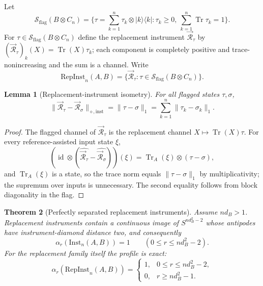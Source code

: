 \documentclass[11pt,a4paper]{article}
\newtheorem{theorem}{Theorem}[section]
\newtheorem{lemma}[theorem]{Lemma}
\newcommand{\Sstate}{\mathcal{S}}
\newcommand{\Inst}{\mathrm{Inst}}
\newcommand{\RepInst}{\mathrm{RepInst}}
\newcommand{\Tr}{\operatorname{Tr}}
\newcommand{\id}{\operatorname{id}}
\begin{document}
Let
\[
\Sstate_{\mathrm{flag}}(B\otimes C_n)
=\Big\{\tau=\sum_{k=1}^n\tau_k\otimes|k\rangle\langle k|:
\tau_k\ge0,\ \sum_{k=1}^n\Tr\tau_k=1\Big\}.
\]
For $\tau\in\Sstate_{\mathrm{flag}}(B\otimes C_n)$ define the replacement instrument $\vec{\mathcal R}_\tau$ by $(\vec{\mathcal R}_\tau)_k(X)=\Tr(X)\tau_k$; each component is completely positive and trace-nonincreasing and the sum is a channel. Write
\[
\RepInst_n(A,B)=\{\vec{\mathcal R}_\tau:\tau\in\Sstate_{\mathrm{flag}}(B\otimes C_n)\}.
\]

\begin{lemma}[Replacement-instrument isometry]
\label{lem:replacement-isometry}
For all flagged states $\tau,\sigma$,
\[
\|\vec{\mathcal R}_\tau-\vec{\mathcal R}_\sigma\|_{\diamond,\mathrm{inst}}
=\|\tau-\sigma\|_1=\sum_{k=1}^n\|\tau_k-\sigma_k\|_1.
\]
\end{lemma}

\begin{proof}
The flagged channel of $\vec{\mathcal R}_\tau$ is the replacement channel $X\mapsto\Tr(X)\tau$. For every reference-assisted input state $\xi$,
\[
(\id\otimes(\widehat{\vec{\mathcal R}_\tau}-\widehat{\vec{\mathcal R}_\sigma}))(\xi)
=\Tr_A(\xi)\otimes(\tau-\sigma),
\]
and $\Tr_A(\xi)$ is a state, so the trace norm equals $\|\tau-\sigma\|_1$ by multiplicativity; the supremum over inputs is unnecessary. The second equality follows from block diagonality in the flag.
\end{proof}

\begin{theorem}[Perfectly separated replacement instruments]
\label{thm:replacement-profile}
Assume $nd_B>1$. Replacement instruments contain a continuous image of $S^{nd_B^2-2}$ whose antipodes have instrument-diamond distance two, and consequently
\[
\alpha_r(\Inst_n(A,B))=1\qquad(0\le r\le nd_B^2-2).
\]
For the replacement family itself the profile is exact:
\[
\alpha_r(\RepInst_n(A,B))=
\begin{cases}
1,&0\le r\le nd_B^2-2,\\
0,&r\ge nd_B^2-1.
\end{cases}
\]
\end{theorem}
\end{document}
